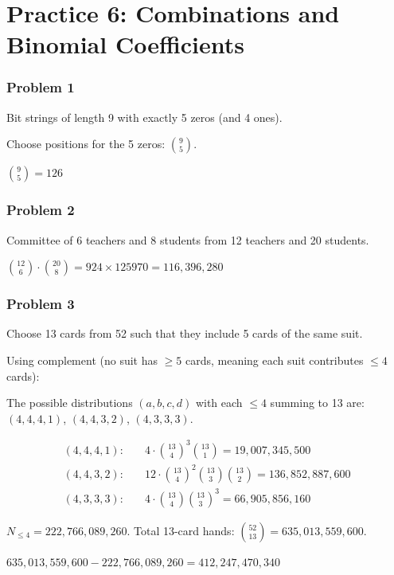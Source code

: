 
\section*{Practice 6: Combinations and Binomial Coefficients}

\subsubsection*{Problem 1}
Bit strings of length 9 with exactly 5 zeros (and 4 ones).

Choose positions for the 5 zeros: $\binom{9}{5}$.

$\boxed{\binom{9}{5} = 126}$

\subsubsection*{Problem 2}
Committee of 6 teachers and 8 students from 12 teachers and 20 students.

$\boxed{\binom{12}{6}\cdot\binom{20}{8} = 924 \times 125970 = 116{,}396{,}280}$

\subsubsection*{Problem 3}
Choose 13 cards from 52 such that they include 5 cards of the same suit.

Using complement (no suit has $\ge 5$ cards, meaning each suit contributes $\le 4$ cards):

The possible distributions $(a,b,c,d)$ with each $\le 4$ summing to 13 are: $(4,4,4,1)$, $(4,4,3,2)$, $(4,3,3,3)$.

\begin{align*}
(4,4,4,1):&\quad 4\cdot\binom{13}{4}^3\binom{13}{1} = 19{,}007{,}345{,}500\\
(4,4,3,2):&\quad 12\cdot\binom{13}{4}^2\binom{13}{3}\binom{13}{2} = 136{,}852{,}887{,}600\\
(4,3,3,3):&\quad 4\cdot\binom{13}{4}\binom{13}{3}^3 = 66{,}905{,}856{,}160
\end{align*}

$N_{\le 4} = 222{,}766{,}089{,}260$.
Total 13-card hands: $\binom{52}{13} = 635{,}013{,}559{,}600$.

$\boxed{635{,}013{,}559{,}600 - 222{,}766{,}089{,}260 = 412{,}247{,}470{,}340}$

